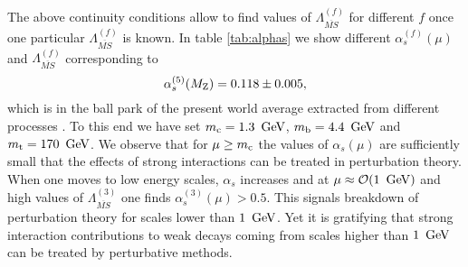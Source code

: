 \documentclass[12pt]{article}
\newcommand{\mt}{m_{\rm t}}
\newcommand{\mc}{m_{\rm c}}
\newcommand{\mb}{m_{\rm b}}
\newcommand{\mz}{M_{\rm Z}}
\newcommand{\gev}{\, {\rm GeV}}
\begin{document}
\begin{itemize}
\begin{itemize}
The above continuity conditions allow to find values of 
$\Lambda^{(f)}_{\overline{MS}}$
for different $f$ once one particular $\Lambda^{(f)}_{\overline{MS}}$
is known. In table \ref{tab:alphas} we show different 
$\alpha^{(f)}_s(\mu)$ and
$\Lambda^{(f)}_{\overline{MS}}$ corresponding to
\begin{equation}\label{asexp}
\alpha_s^{(5)}(\mz)=0.118 \pm 0.005,
\end{equation}
which is in the ball park of the present world average extracted from
different processes \cite{Schmelling}.
To this end we have set
$\mc=1.3~\gev$, $\mb=4.4~\gev$ and $\mt=170~\gev$.
We observe that for $\mu\geq\mc $ the values of
$\alpha_s(\mu)$ are sufficiently small that
the effects of strong interactions can be
treated in perturbation theory. When one
moves to low energy scales, $\alpha_s$ increases and at
$\mu\approx {\cal O}(1~\gev)$ and high values of 
$\Lambda^{(3)}_{\overline{MS}}$  one finds
$\alpha_s^{(3)}(\mu)>0.5$. This signals breakdown of
perturbation theory for scales lower than $1~\gev$. Yet it is
gratifying that strong interaction contributions to weak decays coming
from scales higher than $1~\gev$ can be treated by perturbative
methods.


\end{itemize}
\end{itemize}
\end{document}
